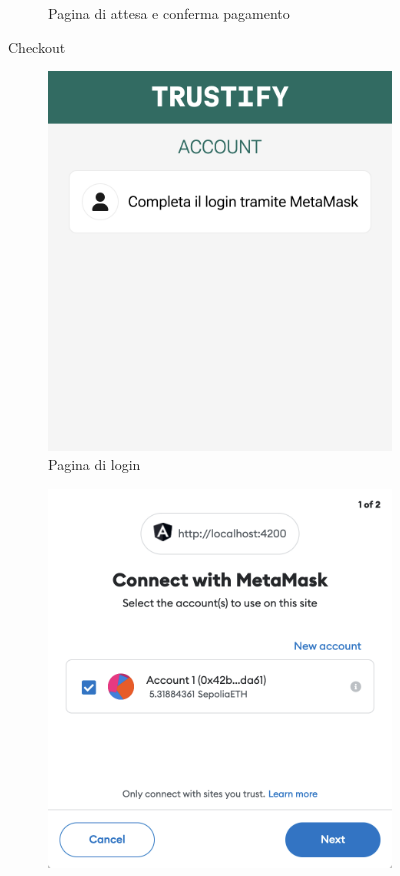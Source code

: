 \begin{figure}[H]
\begin{subfigure}[t]{0.32\textwidth}
    \caption{Pagina di attesa e conferma pagamento}\label{fig:checkout_conferma}
    \end{subfigure}

    \caption{Checkout}\label{fig:checkout}
\end{figure}
\pagebreak

\begin{figure}[H]
    \centering
    \begin{subfigure}[t]{0.32\textwidth}
    \centering
    \includegraphics[width=0.9\linewidth]{src/img/login.png}
    \caption{Pagina di login}\label{fig:login_page}
    \end{subfigure}
    \centering
    \begin{subfigure}[t]{0.32\textwidth}
    \centering
    \includegraphics[width=0.9\linewidth]{src/img/login_metamask.png}

\end{subfigure}
\end{figure}
